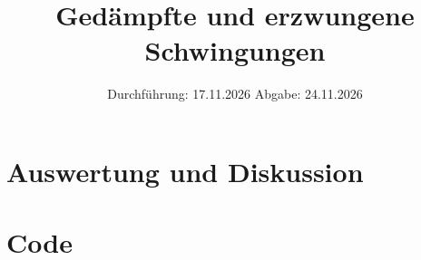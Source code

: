


\subject{VERSUCH 354}
\title{Gedämpfte und erzwungene Schwingungen}
\date{%
  Durchführung: 17.11.2026
  \hspace{3em}
  Abgabe: 24.11.2026
}
\usepackage{subcaption}
\usepackage[section, below]{placeins}
\usepackage[]{caption} %
\usepackage{comment}
\FloatBarrier


\maketitle
\thispagestyle{empty}
\tableofcontents
\newpage


\section{Auswertung und Diskussion}

\printbibliography{}
\section{Code}
\inputminted{python3}{v354/v354.py}

